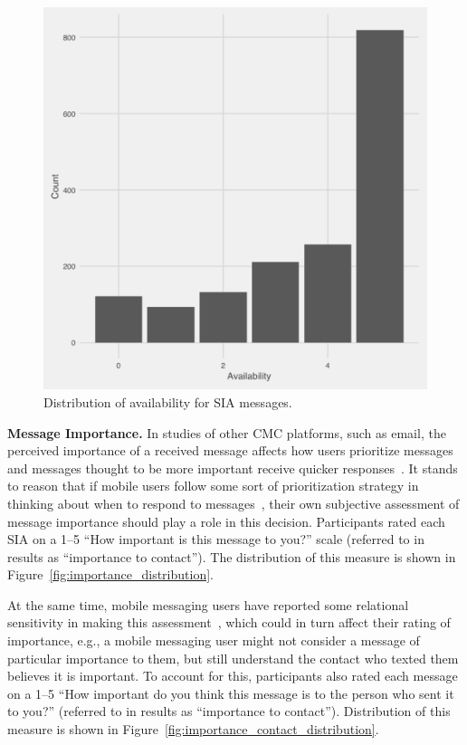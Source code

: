 \documentclass[12pt]{nuthesis}	%
\begin{document}
\begin{figure}[h]
\centering
\includegraphics[width=.7\textwidth]{figures/availability_distribution}
\caption{Distribution of availability for SIA messages.}
\label{fig:availability_distribution}
\end{figure}


\textbf{Message Importance.} In studies of other CMC platforms, such as email, the perceived importance of a received message affects how users prioritize messages~\citep{siu2006going,tsugawa2012estimating} and messages thought to be more important receive quicker responses~\citep{dabbish2005understanding,wainer2011should}. It stands to reason that if mobile users follow some sort of prioritization strategy in thinking about when to respond to messages~\citep{cui2016beyond,wohn2015ambient}, their own subjective assessment of message importance should play a role in this decision. Participants rated each SIA on a 1--5 ``How important is this message to you?'' scale (referred to in results as ``importance to contact''). The distribution of this measure is shown in Figure~\ref{fig:importance_distribution}.

At the same time, mobile messaging users have reported some relational sensitivity in making this assessment~\citep{wohn2015ambient}, which could in turn affect their rating of importance, e.g., a mobile messaging user might not consider a message of particular importance to them, but still understand the contact who texted them believes it is important. To account for this, participants also rated each message on a 1--5 ``How important do you think this message is to the person who sent it to you?'' (referred to in results as ``importance to contact''). Distribution of this measure is shown in Figure~\ref{fig:importance_contact_distribution}.
\end{document}
